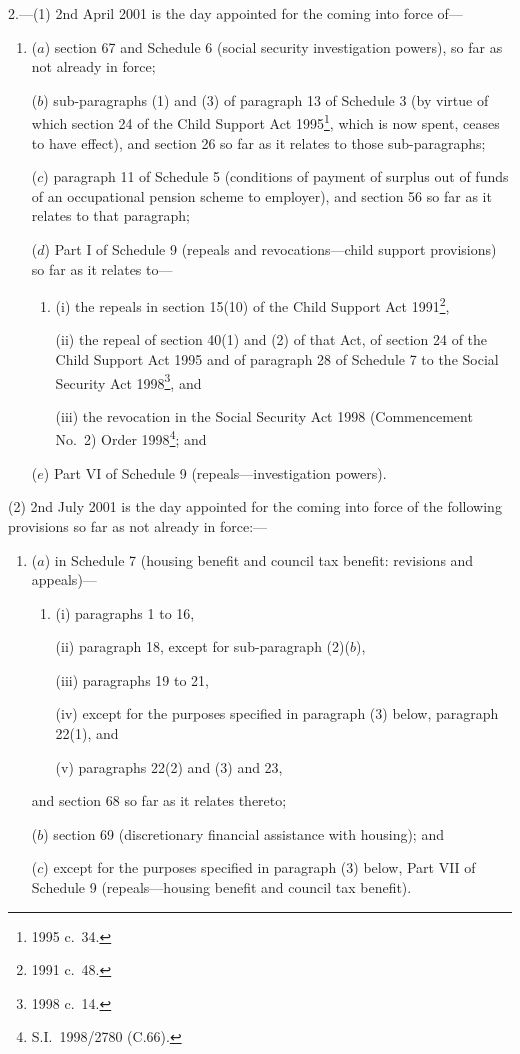 \documentclass[12pt,a4paper]{article}
\begin{document}
2.---(1)  2nd April 2001 is the day appointed for the coming into force of—
\begin{enumerate}\item[]
($a$) section 67 and Schedule 6 (social security investigation powers), so far as not already in force;

($b$) sub-paragraphs (1) and (3) of paragraph 13 of Schedule 3 (by virtue of which section 24 of the Child Support Act 1995\footnote{1995 c.\ 34.}, which is now spent, ceases to have effect), and section 26 so far as it relates to those sub-paragraphs;

($c$) paragraph 11 of Schedule 5 (conditions of payment of surplus out of funds of an occupational pension scheme to employer), and section 56 so far as it relates to that paragraph;

($d$) Part I of Schedule 9 (repeals and revocations—child support provisions) so far as it relates to—
\begin{enumerate}\item[]
(i) the repeals in section 15(10) of the Child Support Act 1991\footnote{1991 c.\ 48.},

(ii) the repeal of section 40(1) and (2) of that Act, of section 24 of the Child Support Act 1995 and of paragraph 28 of Schedule 7 to the Social Security Act 1998\footnote{1998 c.\ 14.}, and

(iii) the revocation in the Social Security Act 1998 (Commencement No.\ 2) Order 1998\footnote{S.I.\ 1998/2780 (C.66).}; and
\end{enumerate}

($e$) Part VI of Schedule 9 (repeals—investigation powers).
\end{enumerate}

(2) 2nd July 2001 is the day appointed for the coming into force of the following provisions so far as not already in force:—
\begin{enumerate}\item[]
($a$) in Schedule 7 (housing benefit and council tax benefit: revisions and appeals)—
\begin{enumerate}\item[]
(i) paragraphs 1 to 16,

(ii) paragraph 18, except for sub-paragraph (2)($b$),

(iii) paragraphs 19 to 21,

(iv) except for the purposes specified in paragraph (3) below, paragraph 22(1), and

(v) paragraphs 22(2) and (3) and 23,
\end{enumerate}
and section 68 so far as it relates thereto;

($b$) section 69 (discretionary financial assistance with housing); and

($c$) except for the purposes specified in paragraph (3) below, Part VII of Schedule 9 (repeals—housing benefit and council tax benefit).
\end{enumerate}
\end{document}
